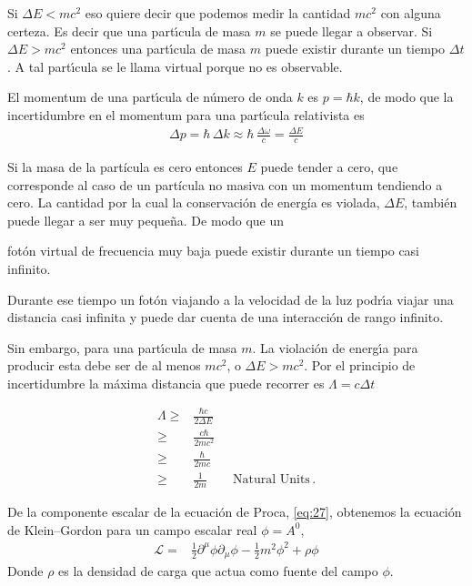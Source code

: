 \begin{frame}
Si $\Delta E< mc^2$ eso quiere decir que podemos medir la cantidad $mc^2$ con alguna certeza. Es decir que una part\'\i cula de masa $m$ se puede llegar a observar. Si $\Delta E>mc^2$ entonces una part\'\i cula de masa $m$ puede existir durante un tiempo $\Delta t$. A tal part\'\i cula se le llama virtual porque no es observable. 

El momentum de una part\'\i cula de n\'umero de onda $k$ es $p=\hbar k$, de modo que la incertidumbre en el momentum para una part\'\i cula relativista es
\begin{align}
  \Delta p=\hbar\, \Delta k \approx\hbar\, \frac{\Delta\omega}{c}=\frac{\Delta E}{c}
\end{align}
\end{frame}

Si la masa de la partícula es cero entonces $E$ puede tender a cero, que corresponde al caso de un partícula no masiva con un momentum tendiendo a cero. La cantidad por la cual la conservaci\'on de energía es violada, $\Delta E$, tambi\'en puede llegar a ser muy peque\~na. De modo que un
\begin{frame}
  fot\'on virtual de frecuencia muy baja puede existir durante un tiempo casi infinito.
\end{frame}
  Durante ese tiempo un fot\'on viajando a la velocidad de la luz podr\'\i a viajar una distancia casi infinita y puede dar cuenta de una interacci\'on de rango infinito. 

\begin{frame}  
Sin embargo, para una part\'\i cula de masa $m$. La violaci\'on de energ\'\i a para producir esta debe ser de al menos $mc^2$, o $\Delta E>mc^2$. Por el principio de incertidumbre la m\'axima distancia que puede recorrer es $\Lambda=c\Delta t$

\begin{align}
\label{eq:244}
  \Lambda \geq & \frac{\hbar c}{2\Delta E}\nonumber\\
  \geq &\frac{c\hbar}{2mc^2}\nonumber\\
  \geq &\frac{\hbar}{2mc}\nonumber\\
  \geq &\frac{1}{2m}\qquad\text{Natural Units} \,.
\end{align}
\end{frame}

\begin{frame}
De la componente escalar de la ecuaci\'on de Proca, \eqref{eq:27}, obtenemos la ecuaci\'on de Klein--Gordon para un campo escalar real $\phi=A^0$,
\begin{align}
  \label{eq:29}
  \mathcal{L}=&\frac{1}{2}\partial^\mu\phi\partial_\mu\phi-\frac{1}{2}m^2\phi^2+\rho\phi
\end{align}
Donde $\rho$ es la densidad de carga que actua como fuente del campo $\phi$.
\end{frame}

